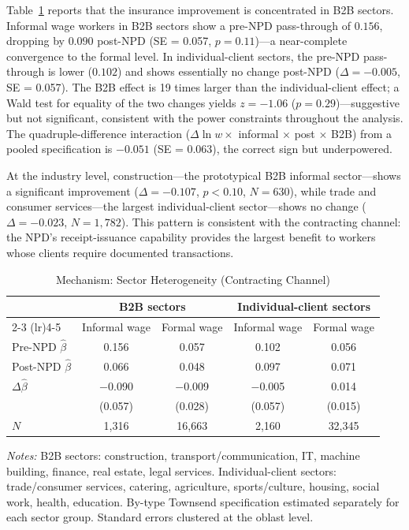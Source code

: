 \documentclass[12pt]{article}
\begin{document}
Table~\ref{tab:channel_sector} reports that the insurance improvement is concentrated in B2B sectors. Informal wage workers in B2B sectors show a pre-NPD pass-through of $0.156$, dropping by $0.090$ post-NPD (SE = 0.057, $p = 0.11$)---a near-complete convergence to the formal level. In individual-client sectors, the pre-NPD pass-through is lower ($0.102$) and shows essentially no change post-NPD ($\Delta = -0.005$, SE = 0.057). The B2B effect is 19 times larger than the individual-client effect; a Wald test for equality of the two changes yields $z = -1.06$ ($p = 0.29$)---suggestive but not significant, consistent with the power constraints throughout the analysis. The quadruple-difference interaction ($\Delta \ln w \times$ informal $\times$ post $\times$ B2B) from a pooled specification is $-0.051$ (SE = 0.063), the correct sign but underpowered.

At the industry level, construction---the prototypical B2B informal sector---shows a significant improvement ($\Delta = -0.107$, $p < 0.10$, $N = 630$), while trade and consumer services---the largest individual-client sector---shows no change ($\Delta = -0.023$, $N = 1{,}782$). This pattern is consistent with the contracting channel: the NPD's receipt-issuance capability provides the largest benefit to workers whose clients require documented transactions.

\begin{table}[htbp]
\centering
\caption{Mechanism: Sector Heterogeneity (Contracting Channel)}
\label{tab:channel_sector}
\small
\begin{tabular}{lcccc}
\toprule
 & \multicolumn{2}{c}{B2B sectors} & \multicolumn{2}{c}{Individual-client sectors} \\
 \cmidrule(lr){2-3} \cmidrule(lr){4-5}
 & Informal wage & Formal wage & Informal wage & Formal wage \\
\midrule
Pre-NPD $\hat{\beta}$ & 0.156 & 0.057 & 0.102 & 0.056 \\
Post-NPD $\hat{\beta}$ & 0.066 & 0.048 & 0.097 & 0.071 \\
$\Delta\hat{\beta}$ & $-$0.090 & $-$0.009 & $-$0.005 & 0.014 \\
 & (0.057) & (0.028) & (0.057) & (0.015) \\[4pt]
$N$ & 1,316 & 16,663 & 2,160 & 32,345 \\
\bottomrule
\end{tabular}
\begin{minipage}{0.9\textwidth}
\vspace{0.3em}
\footnotesize \textit{Notes:} B2B sectors: construction, transport/communication, IT, machine building, finance, real estate, legal services. Individual-client sectors: trade/consumer services, catering, agriculture, sports/culture, housing, social work, health, education. By-type Townsend specification estimated separately for each sector group. Standard errors clustered at the oblast level.
\end{minipage}
\end{table}
\end{document}

